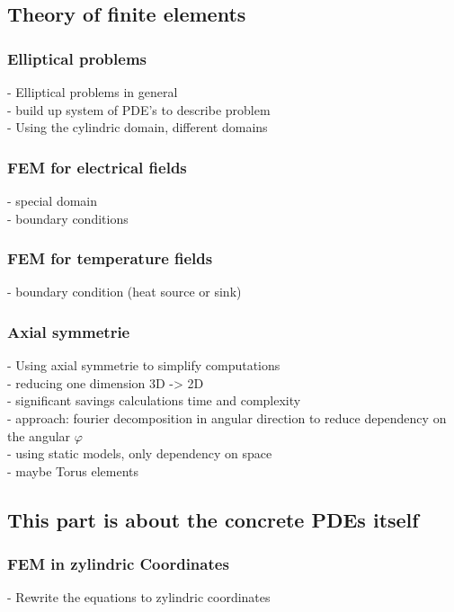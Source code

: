 \documentclass[parskip=half, titlepage=yes, 12pt, BCOR=12mm, DIV=calc]{scrartcl}
\begin{document}
\subsection{Theory of finite elements}

\subsubsection{Elliptical problems}
- Elliptical problems in general \\
- build up system of PDE's to describe problem \\
- Using the cylindric domain, different domains \\

\subsubsection{FEM for electrical fields}
- special domain \\
- boundary conditions \\

\subsubsection{FEM for temperature fields}
- boundary condition (heat source or sink) \\

\subsubsection{Axial symmetrie}
- Using axial symmetrie to simplify computations \\
- reducing one dimension 3D -> 2D \\
- significant savings calculations time and complexity \\
- approach: fourier decomposition in angular direction to reduce dependency on the angular $\varphi$ \\
- using static models, only dependency on space \\
- maybe Torus elements \\


\subsection{This part is about the concrete PDEs itself}

\subsubsection{FEM in zylindric Coordinates}
- Rewrite the equations to zylindric coordinates \\
 
\end{document}

